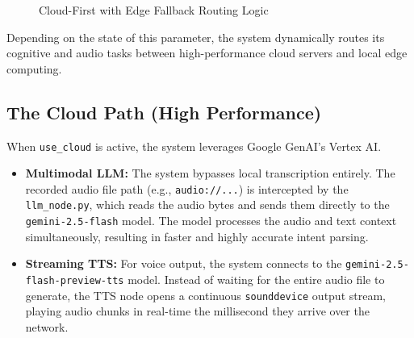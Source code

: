 \begin{figure}[htbp]
    \centering
    \caption{Cloud-First with Edge Fallback Routing Logic}
    \label{fig:s2_hybrid}
\end{figure}

Depending on the state of this parameter, the system dynamically routes its cognitive and audio tasks between high-performance cloud servers and local edge computing.

\subsection{The Cloud Path (High Performance)}
When \texttt{use\_cloud} is active, the system leverages Google GenAI's Vertex AI.
\begin{itemize}
    \item \textbf{Multimodal LLM:} The system bypasses local transcription entirely. The recorded audio file path (e.g., \texttt{audio://...}) is intercepted by the \texttt{llm\_node.py}, which reads the audio bytes and sends them directly to the \texttt{gemini-2.5-flash} model. The model processes the audio and text context simultaneously, resulting in faster and highly accurate intent parsing.
    \item \textbf{Streaming TTS:} For voice output, the system connects to the \texttt{gemini-2.5-flash-preview-tts} model. Instead of waiting for the entire audio file to generate, the TTS node opens a continuous \texttt{sounddevice} output stream, playing audio chunks in real-time the millisecond they arrive over the network.
\end{itemize}

